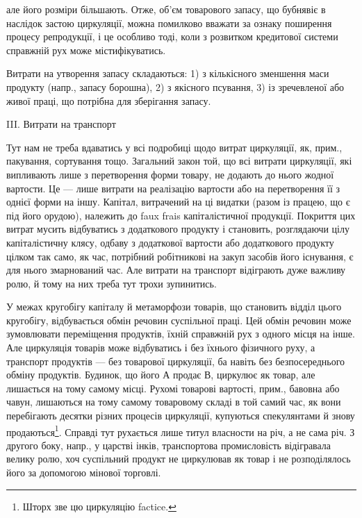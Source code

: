 \parcont{}  %
але його розміри більшають. Отже, об’єм товарового запасу, що
бубнявіє в наслідок застою циркуляції, можна помилково вважати за
ознаку поширення процесу репродукції, і це особливо тоді, коли з розвитком
кредитової системи справжній рух може містифікуватись.

Витрати на утворення запасу складаються: 1) з кількісного зменшення
маси продукту (напр., запасу борошна), 2) з якісного псування, 3) із зречевленої
або живої праці, що потрібна для зберігання запасу.

III. Витрати на транспорт

Тут нам не треба вдаватись у всі подробиці щодо витрат циркуляції,
як, прим., пакування, сортування тощо. Загальний закон той, що всі
витрати циркуляції, які випливають лише з перетворення
форми товару, не додають до нього жодної
вартости. Це — лише витрати на реалізацію вартости або на перетворення
її з однієї форми на іншу. Капітал, витрачений на ці видатки
(разом із працею, що є під його орудою), належить до faux frais капіталістичної
продукції. Покриття цих витрат мусить відбуватись з додаткового
продукту і становить, розглядаючи цілу капіталістичну клясу, одбаву
з додаткової вартости або додаткового продукту цілком так само,
як час, потрібний робітникові на закуп засобів його існування, є для нього
змарнований час. Але витрати на транспорт відіграють дуже важливу
ролю, й тому на них треба тут трохи зупинитись.

У межах кругобігу капіталу й метаморфози товарів, що становить
відділ цього кругобігу, відбувається обмін речовин суспільної праці. Цей
обмін речовин може зумовлювати переміщення продуктів, їхній справжній
рух з одного місця на інше. Але циркуляція товарів може відбуватись і
без їхнього фізичного руху, а транспорт продуктів — без товарової циркуляції,
ба навіть без безпосереднього обміну продуктів. Будинок, що
його А продає В, циркулює як товар, але лишається на тому самому
місці. Рухомі товарові вартості, прим., бавовна або чавун, лишаються
на тому самому товаровому складі в той самий час, як вони перебігають
десятки різних процесів циркуляції, купуються спекулянтами й знову
продаються\footnote{
Шторх зве цю циркуляцію factice.
}. Справді тут рухається лише титул власности на річ, а не
сама річ. З другого боку, напр., у царстві інків, транспортова промисловість
відігравала велику ролю, хоч суспільний продукт не циркулював як
товар і не розподілялось його за допомогою мінової торговлі.

